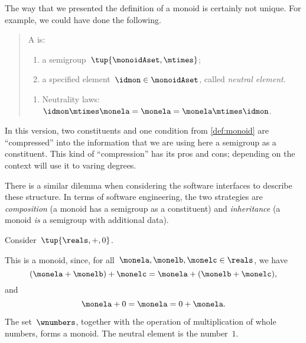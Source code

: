 \begin{remark}
  The way that we presented the definition of a monoid is certainly not unique. For example, we could have done the following.

  \begin{quote}
    A \emph{} is:
    \begin{body}
      \constit
      \begin{enumerate}
        \item a semigroup~$\tup{\monoidAset, \mtimes}$;
        \item a specified element~$\idmon\in \monoidAset$, called \emph{neutral element}.
      \end{enumerate}
      \condit
      \begin{enumerate}
        \item Neutrality laws:~$\idmon\mtimes \monela= \monela= \monela \mtimes \idmon$.
      \end{enumerate}
    \end{body}
  \end{quote}
  In this version, two constituents and one condition from \cref{def:monoid} are ``compressed'' into the information that we are using here a semigroup as a constituent. This kind of ``compression'' has its pros and cons; depending on the context will use it to varing degrees.

  There is a similar dilemma when considering the software interfaces to describe these structure.
  In terms of software engineering, the two strategies are \emph{composition} (a monoid has a semigroup as a constituent)
  and \emph{inheritance} (a monoid \emph{is} a semigroup with additional data).

\end{remark}



\begin{example}
  Consider~$\tup{\reals,+,0}$.

  This is a monoid, since, for all~$\monela,\monelb, \monelc \in \reals$, we have
  \begin{equation*}
  (\monela+\monelb)+\monelc=\monela+(\monelb+\monelc),
  \end{equation*}
  and
  \begin{equation*}
    \monela+0=\monela=0+\monela.
  \end{equation*}
\end{example}

\begin{example}
  The set~$\wnumbers$, together with the operation of multiplication of whole numbers, forms a monoid.
  The neutral element is the number~$1$.
\end{example}

